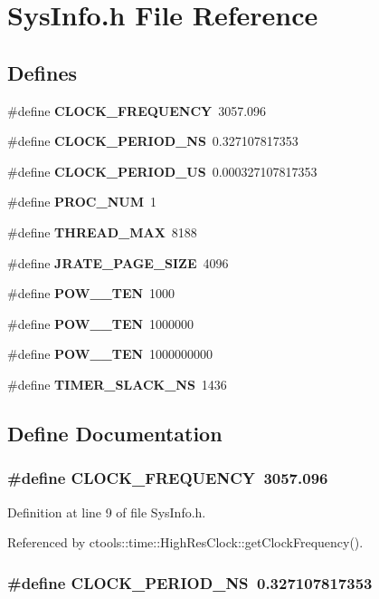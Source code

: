 \section{Sys\-Info.h File Reference}
\label{SysInfo_8h}
\subsection*{Defines}
\begin{CompactItemize}
\item 
\#define {\bf CLOCK\_\-FREQUENCY}\ 3057.096
\item 
\#define {\bf CLOCK\_\-PERIOD\_\-NS}\ 0.327107817353
\item 
\#define {\bf CLOCK\_\-PERIOD\_\-US}\ 0.000327107817353
\item 
\#define {\bf PROC\_\-NUM}\ 1
\item 
\#define {\bf THREAD\_\-MAX}\ 8188
\item 
\#define {\bf JRATE\_\-PAGE\_\-SIZE}\ 4096
\item 
\#define {\bf POW\_\_\-TEN}\ 1000
\item 
\#define {\bf POW\_\_\-TEN}\ 1000000
\item 
\#define {\bf POW\_\_\-TEN}\ 1000000000
\item 
\#define {\bf TIMER\_\-SLACK\_\-NS}\ 1436
\end{CompactItemize}


\subsection{Define Documentation}
\subsubsection{\setlength{\rightskip}{0pt plus 5cm}\#define CLOCK\_\-FREQUENCY\ 3057.096}\label{SysInfo_8h_a0}




Definition at line 9 of file Sys\-Info.h.

Referenced by ctools::time::High\-Res\-Clock::get\-Clock\-Frequency().
\subsubsection{\setlength{\rightskip}{0pt plus 5cm}\#define CLOCK\_\-PERIOD\_\-NS\ 0.327107817353}\label{SysInfo_8h_a1}




